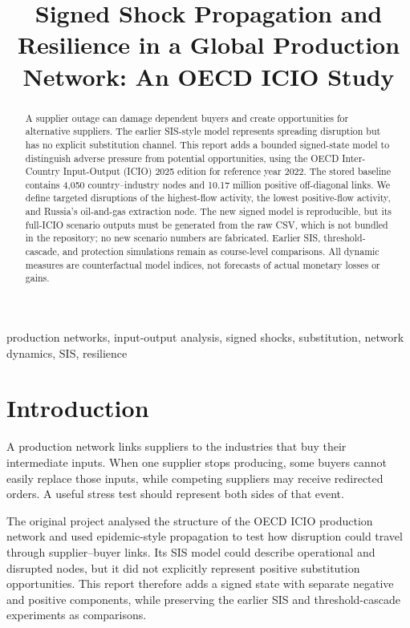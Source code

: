 \documentclass[conference,a4paper,twoside]{IEEEtran}
\title{Signed Shock Propagation and Resilience in a Global Production Network: An OECD ICIO Study}
\author{\IEEEauthorblockN{Group [Number] -- [Member Names]}\IEEEauthorblockA{SC452: Processes on Networks\\\textit{Institution / Department}}}
\begin{document}
\maketitle

\begin{abstract}
A supplier outage can damage dependent buyers and create opportunities for alternative suppliers. The earlier SIS-style model represents spreading disruption but has no explicit substitution channel. This report adds a bounded signed-state model to distinguish adverse pressure from potential opportunities, using the OECD Inter-Country Input-Output (ICIO) 2025 edition for reference year 2022. The stored baseline contains 4,050 country--industry nodes and 10.17 million positive off-diagonal links. We define targeted disruptions of the highest-flow activity, the lowest positive-flow activity, and Russia's oil-and-gas extraction node. The new signed model is reproducible, but its full-ICIO scenario outputs must be generated from the raw CSV, which is not bundled in the repository; no new scenario numbers are fabricated. Earlier SIS, threshold-cascade, and protection simulations remain as course-level comparisons. All dynamic measures are counterfactual model indices, not forecasts of actual monetary losses or gains.
\end{abstract}

\begin{IEEEkeywords}
production networks, input-output analysis, signed shocks, substitution, network dynamics, SIS, resilience
\end{IEEEkeywords}

\section{Introduction}
A production network links suppliers to the industries that buy their intermediate inputs. When one supplier stops producing, some buyers cannot easily replace those inputs, while competing suppliers may receive redirected orders. A useful stress test should represent both sides of that event.

The original project analysed the structure of the OECD ICIO production network and used epidemic-style propagation to test how disruption could travel through supplier--buyer links. Its SIS model could describe operational and disrupted nodes, but it did not explicitly represent positive substitution opportunities. This report therefore adds a signed state with separate negative and positive components, while preserving the earlier SIS and threshold-cascade experiments as comparisons.
\end{document}
